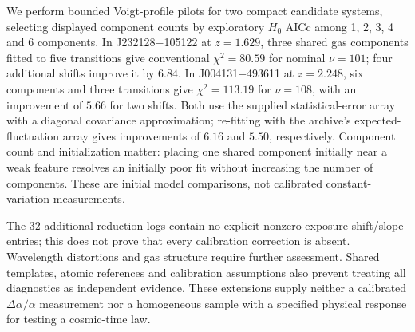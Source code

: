 We perform bounded Voigt-profile pilots for two compact candidate systems, selecting displayed component counts by exploratory $H_0$ AICc among 1, 2, 3, 4 and 6 components. In J232128$-$105122 at $z=1.629$, three shared gas components fitted to five transitions give conventional $\chi^2=80.59$ for nominal $\nu=101$; four additional shifts improve it by $6.84$. In J004131$-$493611 at $z=2.248$, six components and three transitions give $\chi^2=113.19$ for $\nu=108$, with an improvement of $5.66$ for two shifts. Both use the supplied statistical-error array with a diagonal covariance approximation; re-fitting with the archive's expected-fluctuation array gives improvements of $6.16$ and $5.50$, respectively. Component count and initialization matter: placing one shared component initially near a weak feature resolves an initially poor fit without increasing the number of components. These are initial model comparisons, not calibrated constant-variation measurements.

The 32 additional reduction logs contain no explicit nonzero exposure shift/slope entries; this does not prove that every calibration correction is absent. Wavelength distortions and gas structure require further assessment. Shared templates, atomic references and calibration assumptions also prevent treating all diagnostics as independent evidence. These extensions supply neither a calibrated $\Delta\alpha/\alpha$ measurement nor a homogeneous sample with a specified physical response for testing a cosmic-time law.
